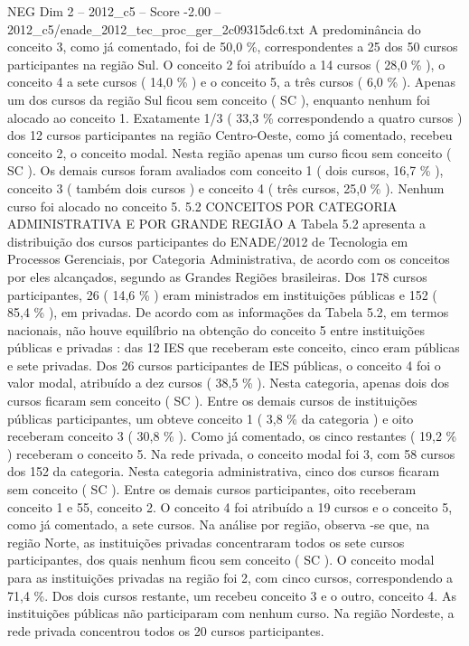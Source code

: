 \begin{textsample}{NEG Dim 2 – 2012\_c5 – Score -2.00 – 2012\_c5/enade\_2012\_tec\_proc\_ger\_2c09315dc6.txt}
A predominância do conceito 3, como já comentado, foi de 50,0 \%, correspondentes a 25 dos 50 cursos participantes na região Sul.
O conceito 2 foi atribuído a 14 cursos ( 28,0 \% ), o conceito 4 a sete cursos ( 14,0 \% ) e o conceito 5, a três cursos ( 6,0 \% ).
Apenas um dos cursos da região Sul ficou sem conceito ( SC ), enquanto nenhum foi alocado ao conceito 1.
Exatamente 1/3 ( 33,3 \% correspondendo a quatro cursos ) dos 12 cursos participantes na região Centro-Oeste, como já comentado, recebeu conceito 2, o conceito modal.
Nesta região apenas um curso ficou sem conceito ( SC ).
Os demais cursos foram avaliados com conceito 1 ( dois cursos, 16,7 \% ), conceito 3 ( também dois cursos ) e conceito 4 ( três cursos, 25,0 \% ).
Nenhum curso foi alocado no conceito 5. 5.2 CONCEITOS POR CATEGORIA ADMINISTRATIVA E POR GRANDE REGIÃO A Tabela 5.2 apresenta a distribuição dos cursos participantes do ENADE/2012 de Tecnologia em Processos Gerenciais, por Categoria Administrativa, de acordo com os conceitos por eles alcançados, segundo as Grandes Regiões brasileiras.
Dos 178 cursos participantes, 26 ( 14,6 \% ) eram ministrados em instituições públicas e 152 ( 85,4 \% ), em privadas.
De acordo com as informações da Tabela 5.2, em termos nacionais, não houve equilíbrio na obtenção do conceito 5 entre instituições públicas e privadas : das 12 IES que receberam este conceito, cinco eram públicas e sete privadas.
Dos 26 cursos participantes de IES públicas, o conceito 4 foi o valor modal, atribuído a dez cursos ( 38,5 \% ).
Nesta categoria, apenas dois dos cursos ficaram sem conceito ( SC ).
Entre os demais cursos de instituições públicas participantes, um obteve conceito 1 ( 3,8 \% da categoria ) e oito receberam conceito 3 ( 30,8 \% ).
Como já comentado, os cinco restantes ( 19,2 \% ) receberam o conceito 5.
Na rede privada, o conceito modal foi 3, com 58 cursos dos 152 da categoria.
Nesta categoria administrativa, cinco dos cursos ficaram sem conceito ( SC ).
Entre os demais cursos participantes, oito receberam conceito 1 e 55, conceito 2.
O conceito 4 foi atribuído a 19 cursos e o conceito 5, como já comentado, a sete cursos.
Na análise por região, observa -se que, na região Norte, as instituições privadas concentraram todos os sete cursos participantes, dos quais nenhum ficou sem conceito ( SC ).
O conceito modal para as instituições privadas na região foi 2, com cinco cursos, correspondendo a 71,4 \%.
Dos dois cursos restante, um recebeu conceito 3 e o outro, conceito 4.
As instituições públicas não participaram com nenhum curso.
Na região Nordeste, a rede privada concentrou todos os 20 cursos participantes.

\end{textsample}
